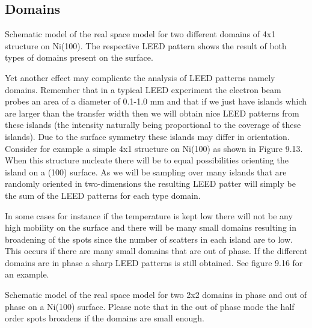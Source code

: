 \subsection{Domains}

\vspace*{10cm}

 Schematic model of the real space model for two different domains of 4x1 structure on Ni(100). The respective LEED pattern shows the result of both types of domains present on the surface.

\vspace{1cm}

Yet another effect may complicate the analysis of LEED patterns namely domains. Remember that in a typical LEED experiment the electron beam probes an area of a diameter of 0.1-1.0 mm and that if we just have islands which are larger than the transfer width then we will obtain nice LEED patterns from these islands (the intensity naturally being proportional to the coverage of these islands). Due to the surface symmetry these islands may differ in orientation. Consider for example a simple 4x1 structure on Ni(100) as shown in Figure 9.13. When this structure nucleate there will be to equal possibilities orienting the island on a (100) surface. As we will be sampling over many islands that are randomly oriented in two-dimensions  the resulting LEED patter will simply be the sum of the LEED patterns for each type domain.




In some cases for instance if the temperature is kept low there will not be any high mobility on the surface and there will be many small domains resulting in broadening of the spots since the number of scatters in each island are to low. This occurs if there are many small domains that are out of phase. If the different domains are in phase a sharp LEED patterns is still obtained. See figure 9.16 for an example.



\vspace*{11cm}

 Schematic model of the real space model for two 2x2 domains in phase and out of phase on a Ni(100) surface. Please note that in the out of phase mode the half order spots broadens if the domains are small enough.

\vspace{1cm}





